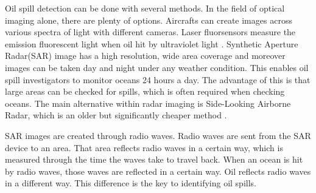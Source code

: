 \hspace{0.5cm} Oil spill detection can be done with several methods. In the field of optical imaging alone, there are plenty of options. Aircrafts can create images across various spectra of light with different cameras. Laser fluorsensors measure the emission fluorescent light when oil hit by ultraviolet light \cite{fingas2014review}. Synthetic Aperture Radar(SAR) image has a high resolution, wide area coverage and moreover images can be taken day and night under any weather condition. This enables oil spill investigators to monitor oceans 24 hours a day\cite{Chang20081915}. The advantage of this is that large areas can be checked for spills, which is often required when checking oceans. The main alternative within radar imaging is Side-Looking Airborne Radar, which is an older but significantly cheaper method \cite{fingas2014review}. 

SAR images are created through radio waves. Radio waves are sent from the SAR device to an area. That area reflects radio waves in a certain way, which is measured through the time the waves take to travel back. \cite{Doerry:04} When an ocean is hit by radio waves, those waves are reflected in a certain way. Oil reflects radio waves in a different way. This difference is the key to identifying oil spills.




